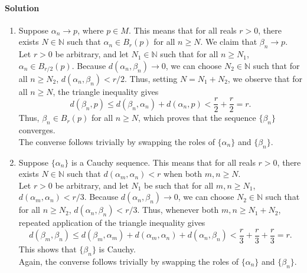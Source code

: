 \documentclass[10pt]{article}
\def\solution{\paragraph{Solution}}
\begin{document}
        \solution
        \begin{enumerate}
                \item Suppose $\alpha_n \to p$, where $p \in M$. This means that for all reals $r > 0$, there exists $N \in \mathbb{N}$
                such that $\alpha_n \in B_r(p)$ for all $n \geq N$. We claim that $\beta_n \to p$. \\

                Let $r > 0$ be arbitrary, and let $N_1 \in \mathbb{N}$ such that for all $n \geq N_1$, $\alpha_n \in B_{r /2}(p)$.
                Because $d(\alpha_n, \beta_n) \to 0$, we can choose $N_2 \in \mathbb{N}$ such that for all $n \geq N_2$,
                $d(\alpha_n, \beta_n) < r /2$. Thus, setting $N = N_1 + N_2$, we observe that for all $n \geq N$, the triangle inequality gives
                \[
                        d(\beta_n, p) \leq d(\beta_n, \alpha_n) + d(\alpha_n, p) < \frac{r}{2} + \frac{r}{2} = r.
                \]
                Thus, $\beta_n \in B_r(p)$ for all $n \geq N$, which proves that the sequence $\{\beta_n\}$ converges. \\

                The converse follows trivially by swapping the roles of $\{\alpha_n\}$ and $\{\beta_n\}$.

                \item Suppose $\{\alpha_n\}$ is a Cauchy sequence. This means that for all reals $r > 0$, there exists $N \in \mathbb{N}$
                such that $d(\alpha_m, \alpha_n) < r$ when both $m, n \geq N$. \\

                Let $r > 0$ be arbitrary, and let $N_1$ be such that for all $m, n \geq N_1$, $d(\alpha_m, \alpha_n) < r /3$.
                Because $d(\alpha_n, \beta_n) \to 0$, we can choose $N_2 \in \mathbb{N}$ such that for all $n \geq N_2$,
                $d(\alpha_n, \beta_n) < r /3$. Thus, whenever both $m, n \geq N_1 + N_2$, repeated application of the 
                triangle inequality gives
                \[
                        d(\beta_m, \beta_n) \leq d(\beta_m, \alpha_m) + d(\alpha_m, \alpha_n) + d(\alpha_n, \beta_n)
                                < \frac{r}{3} + \frac{r}{3} + \frac{r}{3} = r.
                \]
                This shows that $\{\beta_n\}$ is Cauchy. \\

                Again, the converse follows trivially by swapping the roles of $\{\alpha_n\}$ and $\{\beta_n\}$.
        \end{enumerate}
\end{document}
